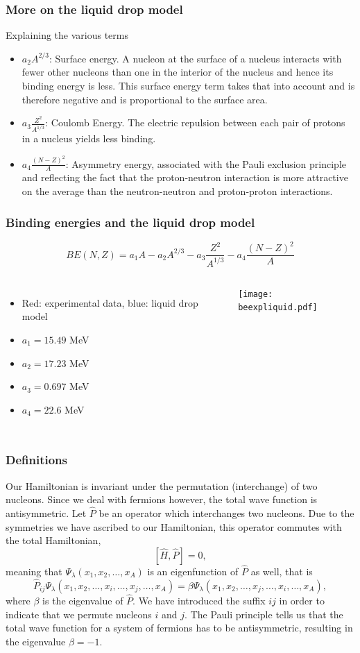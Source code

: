 \documentclass[compress]{beamer}
\begin{document}
\frame
{
  \frametitle{More on the liquid drop model}
  \begin{block}{Explaining the various terms}
\begin{itemize}
\item $a_2A^{2/3}$:   Surface energy. A nucleon at the
surface of a nucleus interacts with fewer other nucleons than one in
the interior of the nucleus and hence its binding energy is less. This
surface energy term takes that into account and is therefore negative
and is proportional to the surface area.
\item $a_3\frac{Z^2}{A^{1/3}}$: Coulomb Energy. The electric
repulsion between each pair of protons in a nucleus yields less binding. 
\item $a_4\frac{(N-Z)^2}{A}$: Asymmetry energy, associated with the Pauli exclusion principle 
and reflecting the fact that the proton-neutron interaction is more attractive on the average than the neutron-neutron and proton-proton interactions.
\end{itemize}

  \end{block}
} 


\frame
    {
      \frametitle{Binding energies and the liquid drop model}
      \begin{footnotesize}
\[ BE(N,Z) = a_1A-a_2A^{2/3}-a_3\frac{Z^2}{A^{1/3}}-a_4\frac{(N-Z)^2}{A}\]
     \begin{columns}
      \column{5.0cm}
\begin{itemize}
\item Red: experimental data, blue: liquid drop model
\item $a_1=15.49$ MeV
\item $a_2=17.23$ MeV
\item $a_3=0.697$ MeV
\item $a_4=22.6$ MeV
\end{itemize}
\column{5cm}
      \begin{center}
	\texttt{[image: beexpliquid.pdf]}
      \end{center}
\end{columns}
      \end{footnotesize}
    }



\frame
{
\frametitle{Definitions}
Our Hamiltonian is invariant under the permutation (interchange) of two nucleons.
Since we deal with fermions however, the total wave function is antisymmetric.
Let $\hat{P}$ be an operator which interchanges two nucleons.
Due to the symmetries we have ascribed to our Hamiltonian, this operator commutes with the total Hamiltonian,
\[
[\hat{H},\hat{P}] = 0,
\]
meaning that $\Psi_{\lambda}(x_1, x_2, \dots , x_A)$ is an eigenfunction of 
$\hat{P}$ as well, that is
\[
\hat{P}_{ij}\Psi_{\lambda}(x_1, x_2, \dots,x_i,\dots,x_j,\dots,x_A)=
\beta\Psi_{\lambda}(x_1, x_2, \dots,x_j,\dots,x_i,\dots,x_A),
\]
where $\beta$ is the eigenvalue of $\hat{P}$. We have introduced the suffix $ij$ in order to indicate that we permute nucleons $i$ and $j$.
The Pauli principle tells us that the total wave function for a system of fermions
has to be antisymmetric, resulting in the eigenvalue $\beta = -1$.   

}
\end{document}
